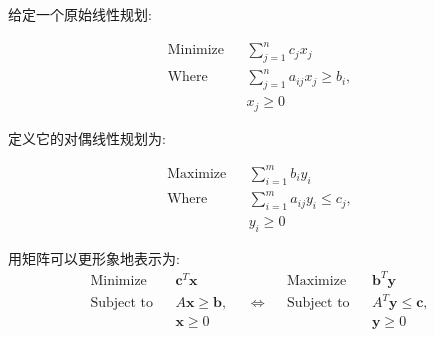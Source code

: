 给定一个原始线性规划:

$$
\begin{aligned}
\text{Minimize}&&\sum_{j=1}^n c_j x_j\\
\text{Where}&&\sum_{j=1}^n a_{ij} x_j\ge b_i,\\
&&x_j\ge 0
\end{aligned}
$$

定义它的对偶线性规划为:

$$
\begin{aligned}
\text{Maximize}&&\sum_{i=1}^m b_i y_i\\
\text{Where}&&\sum_{i=1}^m a_{ij} y_i\le c_j,\\
&&y_i\ge 0
\end{aligned}
$$

用矩阵可以更形象地表示为:
$$
\begin{aligned}
\text{Minimize}&& \mathbf c^T \mathbf x &&&& \text{Maximize} && \mathbf b^{T}\mathbf y\\
\text{Subject to}&& A\mathbf x \ge \mathbf b, && \Longleftrightarrow && \text{Subject to} && A^T\mathbf y \le \mathbf c,\\
&& \mathbf x\ge 0 &&&&&& \mathbf y\ge 0
\end{aligned}
$$
